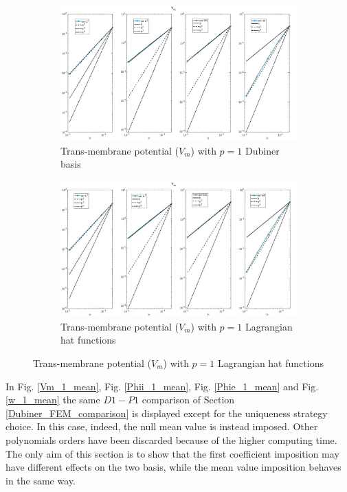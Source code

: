 \documentclass[a4paper,11pt]{article}
\begin{document}
\begin{figure}[H] 
	\caption{Comparison of the trans-membrane potential ($V_m$)}
	\label{Vm_1_mean}
	\begin{subfigure}{\textwidth}
		\begin{center}
			\includegraphics[width = \textwidth]{./errors/D1_Vm_2.jpg}
			\caption{Trans-membrane potential ($V_m$) with $p=1$ Dubiner basis}
		\end{center}
	\end{subfigure}
	\begin{subfigure}{\textwidth}
		\begin{center}
			\includegraphics[width =\textwidth]{./errors/P1_Vm_2.jpg}
			\caption{Trans-membrane potential ($V_m$) with $p=1$ Lagrangian hat functions}
		\end{center}
	\end{subfigure}
\end{figure}


\noindent In Fig. \ref{Vm_1_mean}, Fig. \ref{Phii_1_mean}, Fig. \ref{Phie_1_mean} and Fig. \ref{w_1_mean} the same $D1-P1$ comparison of Section \ref{Dubiner_FEM_comparison} is displayed except for the uniqueness strategy choice. In this case, indeed, the null mean value is instead imposed. Other polynomials orders have been discarded because of the higher computing time. The only aim of this section is to show that the first coefficient imposition may have different effects on the two basis, while the mean value imposition behaves in the same way.
\end{document}
